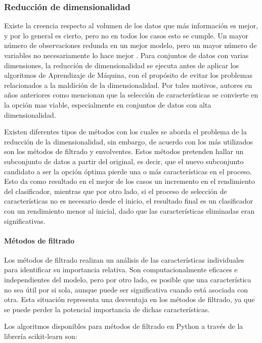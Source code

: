 \subsubsection{Reducción de dimensionalidad}
Existe la creencia respecto al volumen de los datos que más información es mejor, y por lo general es cierto, pero no en todos los casos esto se cumple. Un mayor número de observaciones redunda en un mejor modelo, pero un mayor número de variables no necesariamente lo hace mejor \parencite{Guerrero2016}. Para conjuntos de datos con varias dimensiones, la reducción de dimensionalidad se ejecuta antes de aplicar los algoritmos de Aprendizaje de Máquina, con el propósito de evitar los problemas relacionados a la maldición de la dimensionalidad. Por tales motivos, autores en años anteriores como \textcite{Finley2005} mencionan que la selección de características se convierte en la opción mas viable, especialmente en conjuntos de datos con alta dimensionalidad.

Existen diferentes tipos de métodos con los cuales se aborda el problema de la reducción de la dimensionalidad, sin embargo, de acuerdo con \textcite{Finley2005,Sanchez-Marono2007} los más utilizados son los métodos de filtrado y envolventes. Estos métodos pretenden hallar un subconjunto de datos a partir del original, es decir, que el nuevo subconjunto candidato a ser la opción óptima pierde una o más características en el proceso. Esto da como resultado en el mejor de los casos un incremento en el rendimiento del clasificador, mientras que por otro lado, si el proceso de selección de características no es necesario desde el inicio, el resultado final es un clasificador con un rendimiento menor al inicial, dado que las características eliminadas eran significativas. 
 
\paragraph{Métodos de filtrado} Los métodos de filtrado realizan un análisis de las características individuales para identificar su importancia relativa. Son computacionalmente eficaces e independientes del modelo, pero por otro lado, es posible que una característica no sea útil por si sola, aunque puede ser significativa cuando está asociada con otra. Esta situación representa una desventaja en los métodos de filtrado, ya que se puede perder la potencial importancia de dichas características. 

Los algoritmos disponibles para métodos de filtrado en Python a través de la librería scikit-learn \parencite{sklearn_api} son:
 
